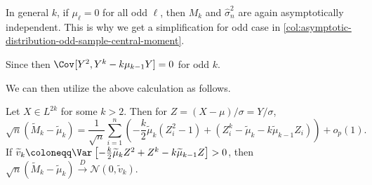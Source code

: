 \begin{remark}
	In general \(k\), if \(\mu _{\ell } = 0\) for all odd \(\ell \), then \(M_k\) and \(\hat{\sigma} _n^2\) are again asymptotically independent. This is why we get a simplification for odd case in \autoref{col:asymptotic-distribution-odd-sample-central-moment}.
\end{remark}
\begin{explanation}
	Since then \(\Cov_{}[Y^2 , Y^k - k \mu _{k-1} Y] = 0\) for odd \(k\).
\end{explanation}

We can then utilize the above calculation as follows.

\begin{theorem}\label{thm:asymptotic-distribution-sample-standardized-central-moment}
	Let \(X \in L^{2k}\) for some \(k > 2\). Then for \(Z = (X - \mu ) / \sigma = Y / \sigma \),
	\[
		\sqrt{n} (\widetilde{M} _k - \widetilde{\mu} _k)
		= \frac{1}{\sqrt{n} } \sum_{i=1}^{n} \left( -\frac{k}{2} \widetilde{\mu} _k (Z_i^2 - 1) + (Z_i^k - \widetilde{\mu} _k - k \widetilde{\mu} _{k-1} Z_i ) \right) + o_p(1).
	\]
	If \(\widetilde{v} _k \coloneqq \Var_{}\left[-\frac{k}{2} \widetilde{\mu} _k Z^2 + Z^k - k \widetilde{\mu} _{k-1} Z \right] > 0\), then \(\sqrt{n} (\widetilde{M} _k - \widetilde{\mu} _k) \overset{D}{\to} \mathcal{N} (0, \widetilde{v} _k)\).
\end{theorem}
